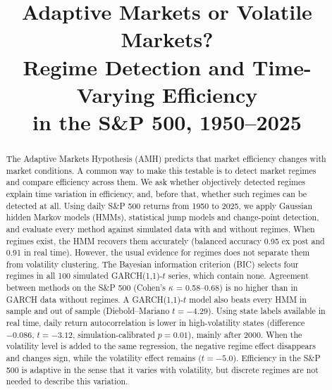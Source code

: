 \documentclass[conference]{IEEEtran}
\begin{document}
\title{Adaptive Markets or Volatile Markets?\\ Regime Detection and Time-Varying Efficiency\\ in the S\&P 500, 1950--2025}

\author{
\and
{}
}

\maketitle

\begin{abstract}
The Adaptive Markets Hypothesis (AMH) predicts that market efficiency changes with market conditions. A common way to make this testable is to detect market regimes and compare efficiency across them. We ask whether objectively detected regimes explain time variation in efficiency, and, before that, whether such regimes can be detected at all. Using daily S\&P 500 returns from 1950 to 2025, we apply Gaussian hidden Markov models (HMMs), statistical jump models and change-point detection, and evaluate every method against simulated data with and without regimes. When regimes exist, the HMM recovers them accurately (balanced accuracy 0.95 ex post and 0.91 in real time). However, the usual evidence for regimes does not separate them from volatility clustering. The Bayesian information criterion (BIC) selects four regimes in all 100 simulated GARCH(1,1)-$t$ series, which contain none. Agreement between methods on the S\&P 500 (Cohen's $\kappa$ = 0.58--0.68) is no higher than in GARCH data without regimes. A GARCH(1,1)-$t$ model also beats every HMM in sample and out of sample (Diebold--Mariano $t = -4.29$). Using state labels available in real time, daily return autocorrelation is lower in high-volatility states (difference $-0.086$, $t = -3.12$, simulation-calibrated $p = 0.01$), mainly after 2000. When the volatility level is added to the same regression, the negative regime effect disappears and changes sign, while the volatility effect remains ($t = -5.0$). Efficiency in the S\&P 500 is adaptive in the sense that it varies with volatility, but discrete regimes are not needed to describe this variation.
\end{abstract}
\end{document}
